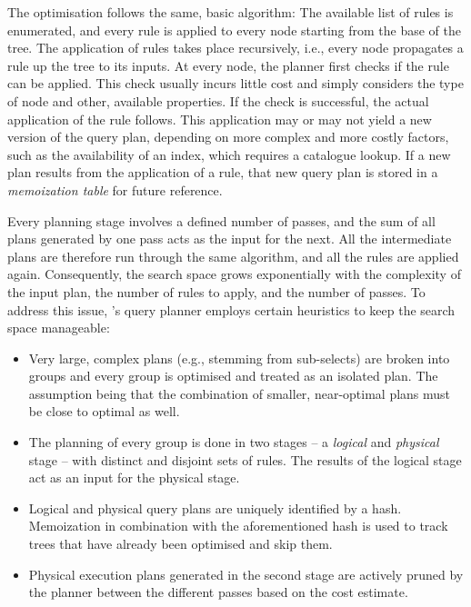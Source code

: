 The optimisation follows the same, basic algorithm: The available list of rules is enumerated, and every rule is applied to every node starting from the base of the tree. The application of rules takes place recursively, i.e., every node propagates a rule up the tree to its inputs. At every node, the planner first checks if the rule can be applied. This check usually incurs little cost and simply considers the type of node and other, available properties. If the check is successful, the actual application of the rule follows. This application may or may not yield a new version of the query plan, depending on more complex and more costly factors, such as the availability of an index, which requires a catalogue lookup. If a new plan results from the application of a rule, that new query plan is stored in a \emph{memoization table} for future reference. 

Every planning stage involves a defined number of passes, and the sum of all plans generated by one pass acts as the input for the next. All the intermediate plans are therefore run through the same algorithm, and all the rules are applied again. Consequently, the search space grows exponentially with the complexity of the input plan, the number of rules to apply, and the number of passes. To address this issue, \cottontail{}'s query planner employs certain heuristics to keep the search space manageable:

\begin{itemize}
    \item Very large, complex plans (e.g., stemming from sub-selects) are broken into groups and every group is optimised and treated as an isolated plan. The assumption being that the combination of smaller, near-optimal plans must be close to optimal as well.
    \item The planning of every group is done in two stages -- a \emph{logical} and \emph{physical} stage -- with distinct and disjoint sets of rules. The results of the logical stage act as an input for the physical stage.
    \item Logical and physical query plans are uniquely identified by a hash. Memoization in combination with the aforementioned hash is used to track trees that have already been optimised and skip them.
    \item Physical execution plans generated in the second stage are actively pruned by the planner between the different passes based on the cost estimate.
\end{itemize}

